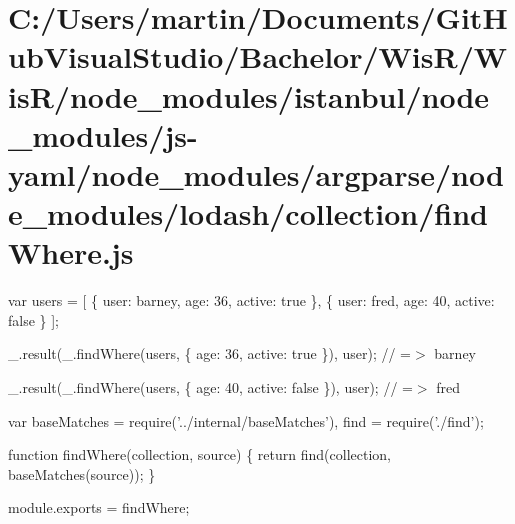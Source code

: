 \hypertarget{_c_1_2_users_2martin_2_documents_2_git_hub_visual_studio_2_bachelor_2_wis_r_2_wis_r_2node_module89660d33641a4156db3122f385a88d14}{}\section{C\+:/\+Users/martin/\+Documents/\+Git\+Hub\+Visual\+Studio/\+Bachelor/\+Wis\+R/\+Wis\+R/node\+\_\+modules/istanbul/node\+\_\+modules/js-\/yaml/node\+\_\+modules/argparse/node\+\_\+modules/lodash/collection/find\+Where.\+js}
var users = \mbox{[} \{ \textquotesingle{}user\textquotesingle{}\+: \textquotesingle{}barney\textquotesingle{}, \textquotesingle{}age\textquotesingle{}\+: 36, \textquotesingle{}active\textquotesingle{}\+: true \}, \{ \textquotesingle{}user\textquotesingle{}\+: \textquotesingle{}fred\textquotesingle{}, \textquotesingle{}age\textquotesingle{}\+: 40, \textquotesingle{}active\textquotesingle{}\+: false \} \mbox{]};

\+\_\+.\+result(\+\_\+.\+find\+Where(users, \{ \textquotesingle{}age\textquotesingle{}\+: 36, \textquotesingle{}active\textquotesingle{}\+: true \}), \textquotesingle{}user\textquotesingle{}); // =$>$ \textquotesingle{}barney\textquotesingle{}

\+\_\+.\+result(\+\_\+.\+find\+Where(users, \{ \textquotesingle{}age\textquotesingle{}\+: 40, \textquotesingle{}active\textquotesingle{}\+: false \}), \textquotesingle{}user\textquotesingle{}); // =$>$ \textquotesingle{}fred\textquotesingle{}


\begin{DoxyCodeInclude}
var baseMatches = require(\textcolor{stringliteral}{'../internal/baseMatches'}),
    find = require(\textcolor{stringliteral}{'./find'});

\textcolor{keyword}{function} findWhere(collection, source) \{
  \textcolor{keywordflow}{return} find(collection, baseMatches(source));
\}

module.exports = findWhere;
\end{DoxyCodeInclude}
 